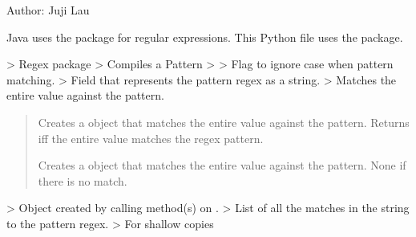 \documentclass[letterpaper,10pt,english]{sphinxmanual}
\begin{document}
\sphinxAtStartPar
Author: Juji Lau
\begin{description}
\sphinxAtStartPar
Java uses the package  for regular expressions.
This Python file uses the  package.
\begin{description}
\sphinxAtStartPar
{}           \sphinxhyphen{}\textgreater{}                      Regex package
           \sphinxhyphen{}\textgreater{}            Compiles a Pattern
             \sphinxhyphen{}\textgreater{}  
  \sphinxhyphen{}\textgreater{}           Flag to ignore case when pattern matching.
           \sphinxhyphen{}\textgreater{}         Field that represents the pattern regex as a string.
  \sphinxhyphen{}\textgreater{}          Matches the entire value against the pattern.
\begin{quote}
\begin{description}
\sphinxAtStartPar
{}    Creates a  object that matches the entire value against the pattern.
                 Returns  iff the entire value matches the regex pattern.

\sphinxAtStartPar
{}       Creates a    object that matches the entire value against the pattern. None if there is no match.

\end{description}
\end{quote}

\sphinxAtStartPar
{}             \sphinxhyphen{}\textgreater{}                Object created by calling method(s) on .
          \sphinxhyphen{}\textgreater{}          List of all the matches in the string to the pattern regex.
  \sphinxhyphen{}\textgreater{}             For shallow copies

\end{description}

\end{description}
\end{document}
